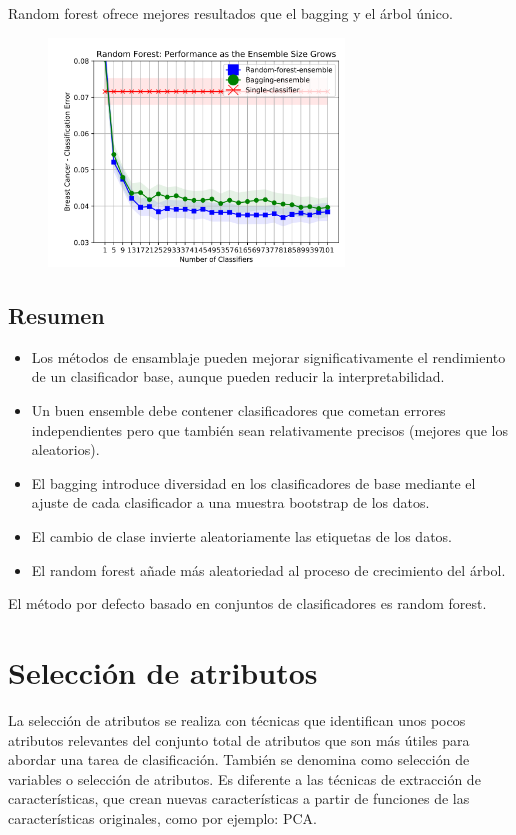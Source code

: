 Random forest ofrece mejores resultados que el bagging y el árbol único.

\begin{figure}[h]
\centering
\includegraphics[width = 0.7\textwidth]{figs/noclass-bagging-randomforest.png}
\end{figure}

\subsection{Resumen}
\begin{itemize}
\item Los métodos de ensamblaje pueden mejorar significativamente el rendimiento de un clasificador base, aunque pueden reducir la interpretabilidad.
\item Un buen ensemble debe contener clasificadores que cometan errores independientes pero que también sean relativamente precisos (mejores que los aleatorios).
\item El bagging introduce diversidad en los clasificadores de base mediante el ajuste de cada clasificador a una muestra bootstrap de los datos.
\item El cambio de clase invierte aleatoriamente las etiquetas de los datos.
\item El random forest añade más aleatoriedad al proceso de crecimiento del árbol.
\end{itemize}

El método por defecto basado en conjuntos de clasificadores es random forest.

\section{Selección de atributos}
La selección de atributos se realiza con técnicas que identifican unos pocos atributos relevantes del conjunto total de atributos que son más útiles para abordar una tarea de clasificación. También se denomina como selección de variables o selección de atributos. Es diferente a las técnicas de extracción de características, que crean nuevas características a partir de funciones de las características originales, como por ejemplo: PCA.

